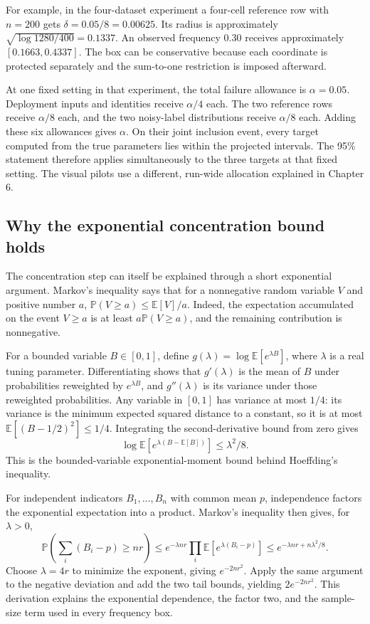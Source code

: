 \documentclass[11pt,a4paper]{report}
\newcommand{\E}{\mathbb E}
\newcommand{\Prob}{\mathbb P}
\begin{document}
For example, in the four-dataset experiment a four-cell reference row with $n=200$ gets $\delta=0.05/8=0.00625$. Its radius is approximately $\sqrt{\log1280/400}=0.1337$. An observed frequency $0.30$ receives approximately $[0.1663,0.4337]$. The box can be conservative because each coordinate is protected separately and the sum-to-one restriction is imposed afterward.

At one fixed setting in that experiment, the total failure allowance is $\alpha=0.05$. Deployment inputs and identities receive $\alpha/4$ each. The two reference rows receive $\alpha/8$ each, and the two noisy-label distributions receive $\alpha/8$ each. Adding these six allowances gives $\alpha$. On their joint inclusion event, every target computed from the true parameters lies within the projected intervals. The 95\% statement therefore applies simultaneously to the three targets at that fixed setting. The visual pilots use a different, run-wide allocation explained in Chapter 6.

\subsection{Why the exponential concentration bound holds}
The concentration step can itself be explained through a short exponential argument. Markov's inequality says that for a nonnegative random variable $V$ and positive number $a$, $\Prob(V\geq a)\leq\E[V]/a$. Indeed, the expectation accumulated on the event $V\geq a$ is at least $a\Prob(V\geq a)$, and the remaining contribution is nonnegative.

For a bounded variable $B\in[0,1]$, define $g(\lambda)=\log\E[e^{\lambda B}]$, where $\lambda$ is a real tuning parameter. Differentiating shows that $g'(\lambda)$ is the mean of $B$ under probabilities reweighted by $e^{\lambda B}$, and $g''(\lambda)$ is its variance under those reweighted probabilities. Any variable in $[0,1]$ has variance at most $1/4$: its variance is the minimum expected squared distance to a constant, so it is at most $\E[(B-1/2)^2]\leq1/4$. Integrating the second-derivative bound from zero gives
\begin{equation}
\log\E[e^{\lambda(B-\E[B])}]\leq\lambda^2/8.
\end{equation}
This is the bounded-variable exponential-moment bound behind Hoeffding's inequality.

For independent indicators $B_1,\ldots,B_n$ with common mean $p$, independence factors the exponential expectation into a product. Markov's inequality then gives, for $\lambda>0$,
\begin{equation}
\Prob\left(\sum_i(B_i-p)\geq nr\right)
\leq e^{-\lambda nr}\prod_i\E[e^{\lambda(B_i-p)}]
\leq e^{-\lambda nr+n\lambda^2/8}.
\end{equation}
Choose $\lambda=4r$ to minimize the exponent, giving $e^{-2nr^2}$. Apply the same argument to the negative deviation and add the two tail bounds, yielding $2e^{-2nr^2}$. This derivation explains the exponential dependence, the factor two, and the sample-size term used in every frequency box.
\end{document}
